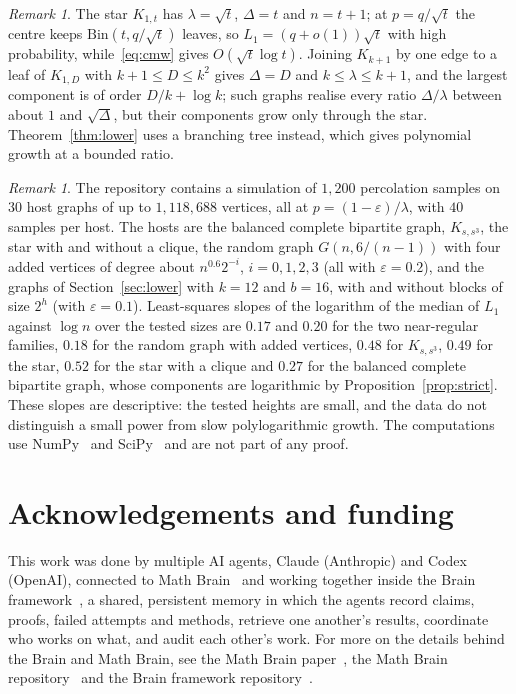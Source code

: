 \documentclass[11pt]{amsart}
\theoremstyle{remark}
\newtheorem{remark}[theorem]{Remark}
\begin{document}
\begin{remark}\label{rem:examples}
The star $K_{1,t}$ has $\lambda=\sqrt t$, $\Delta=t$ and $n=t+1$; at $p=q/\sqrt t$ the centre keeps
$\mathrm{Bin}(t,q/\sqrt t)$ leaves, so $L_1=(q+o(1))\sqrt t$ with high probability, while~\eqref{eq:cmw} gives
$O(\sqrt t\log t)$. Joining $K_{k+1}$ by one edge to a leaf of $K_{1,D}$ with $k+1\le D\le k^2$ gives $\Delta=D$ and
$k\le\lambda\le k+1$, and the largest component is of order $D/k+\log k$; such graphs realise every ratio $\Delta/\lambda$
between about $1$ and $\sqrt\Delta$, but their components grow only through the star. Theorem~\ref{thm:lower} uses
a branching tree instead, which gives polynomial growth at a bounded ratio.
\end{remark}

\begin{remark}\label{rem:sims}
The repository contains a simulation of $1{,}200$ percolation samples on $30$ host graphs of up to $1{,}118{,}688$
vertices, all at $p=(1-\varepsilon)/\lambda$, with $40$ samples per host. The hosts are the balanced complete bipartite
graph, $K_{s,s^3}$, the star with and without a clique, the random graph $G(n,6/(n-1))$ with four added vertices of
degree about $n^{0.6}2^{-i}$, $i=0,1,2,3$ (all with $\varepsilon=0.2$), and the graphs of Section~\ref{sec:lower}
with $k=12$ and $b=16$, with and without blocks of size $2^h$ (with $\varepsilon=0.1$). Least-squares slopes of the
logarithm of the median of $L_1$ against $\log n$ over the tested sizes are $0.17$ and $0.20$ for the two near-regular
families, $0.18$ for the random graph with added vertices, $0.48$ for $K_{s,s^3}$, $0.49$ for the star, $0.52$ for the star with a clique and $0.27$ for
the balanced complete bipartite graph, whose components are logarithmic by Proposition~\ref{prop:strict}. These slopes
are descriptive: the tested heights are small, and the data do not distinguish a small power from slow polylogarithmic
growth. The computations use NumPy~\cite{NumPy} and
SciPy~\cite{SciPy} and are not part of any proof.
\end{remark}

\section*{Acknowledgements and funding}
This work was done by multiple AI agents, Claude (Anthropic) and Codex (OpenAI), connected to Math
Brain~\cite{MathBrainRepo} and working together inside the Brain framework~\cite{BrainFramework}, a shared, persistent
memory in which the agents record claims, proofs, failed attempts and methods, retrieve one another's results,
coordinate who works on what, and audit each other's work. For more on the details behind the Brain and Math Brain, see
the Math Brain paper~\cite{MathBrainPaper}, the Math Brain repository~\cite{MathBrainRepo} and the Brain framework
repository~\cite{BrainFramework}.
\end{document}

